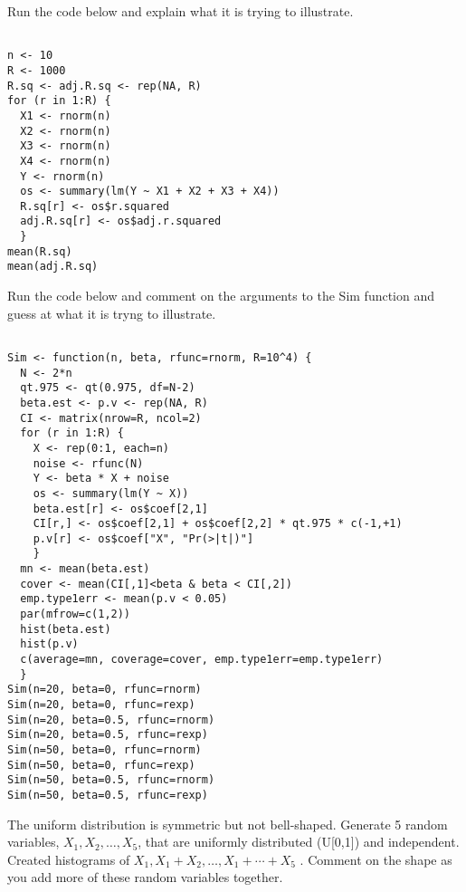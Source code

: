 \documentclass[11pt]{article}
\begin{document}
 Run the code below and explain what it is trying to illustrate.

\begin{spacing}{1.0}
\begin{lstlisting}

n <- 10
R <- 1000
R.sq <- adj.R.sq <- rep(NA, R) 
for (r in 1:R) {
  X1 <- rnorm(n)
  X2 <- rnorm(n)
  X3 <- rnorm(n)
  X4 <- rnorm(n)
  Y <- rnorm(n)
  os <- summary(lm(Y ~ X1 + X2 + X3 + X4))
  R.sq[r] <- os$r.squared
  adj.R.sq[r] <- os$adj.r.squared
  }
mean(R.sq)
mean(adj.R.sq)

\end{lstlisting}
\end{spacing}

\vspace{5mm}

 Run the code below and comment on the arguments to the Sim function and guess at what it is tryng to illustrate.

\begin{spacing}{1.0}
\begin{lstlisting}

Sim <- function(n, beta, rfunc=rnorm, R=10^4) {
  N <- 2*n
  qt.975 <- qt(0.975, df=N-2)
  beta.est <- p.v <- rep(NA, R)
  CI <- matrix(nrow=R, ncol=2)
  for (r in 1:R) {
    X <- rep(0:1, each=n)
    noise <- rfunc(N)
    Y <- beta * X + noise
    os <- summary(lm(Y ~ X))
    beta.est[r] <- os$coef[2,1]
    CI[r,] <- os$coef[2,1] + os$coef[2,2] * qt.975 * c(-1,+1)
    p.v[r] <- os$coef["X", "Pr(>|t|)"]
    }
  mn <- mean(beta.est)
  cover <- mean(CI[,1]<beta & beta < CI[,2])
  emp.type1err <- mean(p.v < 0.05)
  par(mfrow=c(1,2))
  hist(beta.est)
  hist(p.v)
  c(average=mn, coverage=cover, emp.type1err=emp.type1err)
  }
Sim(n=20, beta=0, rfunc=rnorm)
Sim(n=20, beta=0, rfunc=rexp)
Sim(n=20, beta=0.5, rfunc=rnorm)
Sim(n=20, beta=0.5, rfunc=rexp)
Sim(n=50, beta=0, rfunc=rnorm)
Sim(n=50, beta=0, rfunc=rexp)
Sim(n=50, beta=0.5, rfunc=rnorm)
Sim(n=50, beta=0.5, rfunc=rexp)

\end{lstlisting}
\end{spacing}

 The uniform distribution is symmetric but not bell-shaped. Generate 5 random variables, $X_1,X_2,\ldots,X_5$, that are uniformly distributed (U[0,1]) and independent. Created histograms of $X_1, X_1+X_2, \ldots, X_1+\cdots+X_5$ . Comment on the shape as you add more of these random variables together.
\end{document}
